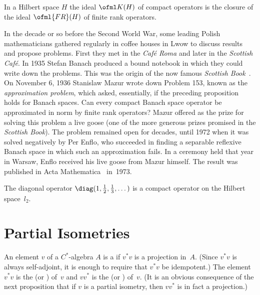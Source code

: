 \begin{prop}\label{prop_K_is_clo_FR} In a Hilbert space $H$ the ideal $\ofml K(H)$ of compact operators is the closure of
the ideal $\ofml{FR}(H)$ of finite rank operators.
\end{prop}

In the decade or so before the Second World War, some leading Polish mathematicians gathered regularly in coffee
houses in Lwow to discuss results and propose problems.  First they met in the \emph{Caf\'e Roma} and later in the
\emph{Scottish Caf\'e}.  In 1935 Stefan Banach produced a bound notebook in which they could write down the problems.
This was the origin of the now famous \emph{Scottish Book}~\cite{Mauldin:1981}.  On November 6, 1936 Stanislaw Mazur
wrote down Problem 153, known as the \emph{approximation problem}, which asked, essentially, if the preceding proposition
holds for Banach spaces.  Can every compact Banach space operator be approximated in norm by finite rank operators?
Mazur offered as the prize for solving this problem a live goose (one of the more generous prizes promised in the
\emph{Scottish Book}).  The problem remained open for decades,  until 1972 when it was solved negatively by Per Enflo,
who succeeded in finding a separable reflexive Banach space in which such an approximation fails.  In a ceremony held
that year in Warsaw, Enflo received his live goose from Mazur himself.  The result was published in Acta
Mathematica~\cite{Enflo:1973} in~1973.

\begin{exam} The diagonal operator $\diag(1,\frac12,\frac13,\dots)$ is a compact operator on the Hilbert space~$l_2$.
\end{exam}











\section{Partial Isometries}
\begin{defn}  An element $v$ of a $C^*$-algebra $A$ is a
 if $v^*v$ is a projection in~$A$.  (Since $v^*v$ is always
self-adjoint, it is enough to require that $v^*v$ be idempotent.)  The element $v^*v$ is
the
 (or
)  of~$v$ and $vv^*$ is the
 (or
)  of~$v$.  (It is an obvious consequence of the next
proposition that if $v$ is a partial isometry, then $vv^*$ is in fact a projection.)
\end{defn}

